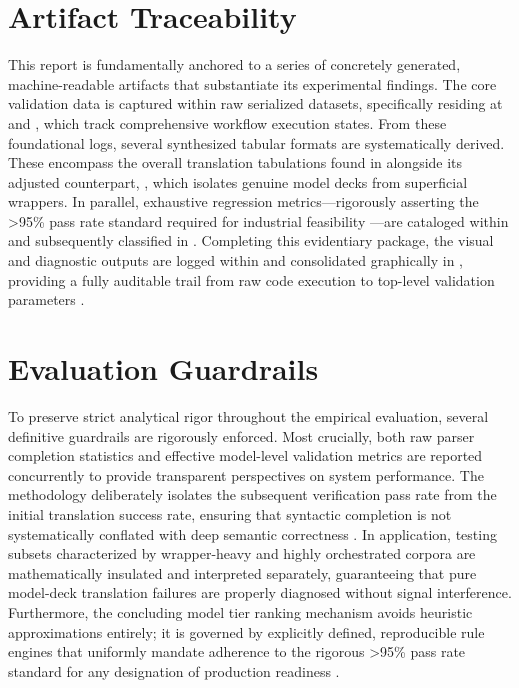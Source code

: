 \documentclass[12pt,a4paper,oneside]{report}
\begin{document}
\section{Artifact Traceability}
This report is fundamentally anchored to a series of concretely generated, machine-readable artifacts that substantiate its experimental findings. The core validation data is captured within raw serialized datasets, specifically residing at  and , which track comprehensive workflow execution states. From these foundational logs, several synthesized tabular formats are systematically derived. These encompass the overall translation tabulations found in  alongside its adjusted counterpart, , which isolates genuine model decks from superficial wrappers. In parallel, exhaustive regression metrics—rigorously asserting the >95\% pass rate standard required for industrial feasibility \cite{benchmarking_mlsys,autospice}—are cataloged within  and subsequently classified in . Completing this evidentiary package, the visual and diagnostic outputs are logged within  and consolidated graphically in , providing a fully auditable trail from raw code execution to top-level validation parameters \cite{openpdk}.

\section{Evaluation Guardrails}
To preserve strict analytical rigor throughout the empirical evaluation, several definitive guardrails are rigorously enforced. Most crucially, both raw parser completion statistics and effective model-level validation metrics are reported concurrently to provide transparent perspectives on system performance. The methodology deliberately isolates the subsequent verification pass rate from the initial translation success rate, ensuring that syntactic completion is not systematically conflated with deep semantic correctness \cite{translation_limits}. In application, testing subsets characterized by wrapper-heavy and highly orchestrated corpora are mathematically insulated and interpreted separately, guaranteeing that pure model-deck translation failures are properly diagnosed without signal interference. Furthermore, the concluding model tier ranking mechanism avoids heuristic approximations entirely; it is governed by explicitly defined, reproducible rule engines that uniformly mandate adherence to the rigorous >95\% pass rate standard for any designation of production readiness \cite{eda_standards,autospice}.
\end{document}
